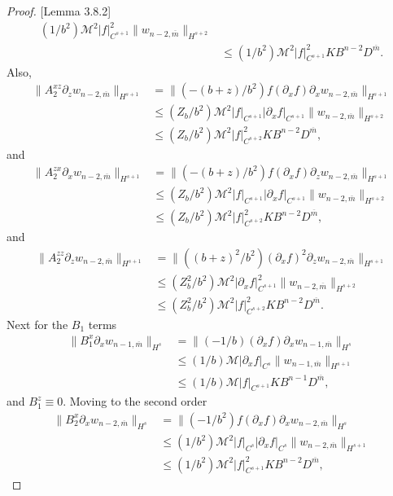 \begin{proof}{[Lemma 3.8.2]}
\begin{align*}
(1/b^2)\mathcal{M}^2|f|_{C^{s+1}}^2\|w_{n-2, \overline{m}}\|_{H^{s+2}} \\&\le
(1/b^2)\mathcal{M}^2|f|_{C^{s+1}}^2KB^{n-2}D^{\overline{m}}.
\end{align*}
Also,
\begin{align*}
\|A_2^{xz}\partial_z w_{n-2,\overline{m}}\|_{H^{s+1}} &= 
\|(-(b+z)/b^2)f(\partial_x f)\partial_x w_{n-2,\overline{m}}\|_{H^{s+1}}\\&\le
(Z_b/b^2)\mathcal{M}^2|f|_{C^{s+1}}|\partial_x f|_{C^{s+1}}\|w_{n-2, \overline{m}}\|_{H^{s+2}} \\&\le
(Z_b/b^2)\mathcal{M}^2|f|_{C^{s+2}}^2KB^{n-2}D^{\overline{m}},
\end{align*}
and
\begin{align*}
\|A_2^{zx}\partial_x w_{n-2,\overline{m}}\|_{H^{s+1}} &= 
\|(-(b+z)/b^2)f(\partial_x f)\partial_z w_{n-2,\overline{m}}\|_{H^{s+1}}\\&\le
(Z_b/b^2)\mathcal{M}^2|f|_{C^{s+1}}|\partial_x f|_{C^{s+1}}\|w_{n-2, \overline{m}}\|_{H^{s+2}} \\&\le
(Z_b/b^2)\mathcal{M}^2|f|_{C^{s+2}}^2KB^{n-2}D^{\overline{m}},
\end{align*}
and
\begin{align*}
\|A_2^{zz}\partial_z w_{n-2,\overline{m}}\|_{H^{s+1}} &= 
\|((b+z)^2/b^2)(\partial_x f)^2\partial_z w_{n-2,\overline{m}}\|_{H^{s+1}}\\&\le
(Z_b^2/b^2)\mathcal{M}^2|\partial_x f|_{C^{s+1}}^2\|w_{n-2, \overline{m}}\|_{H^{s+2}} \\&\le
(Z_b^2/b^2)\mathcal{M}^2|f|_{C^{s+2}}^2KB^{n-2}D^{\overline{m}}.
\end{align*}
Next for the $B_1$ terms
\begin{align*}
\|B_1^{x}\partial_x w_{n-1,\overline{m}}\|_{H^{s}} &= 
\|(-1/b)(\partial_x f)\partial_x w_{n-1,\overline{m}}\|_{H^{s}}\\&\le
(1/b)\mathcal{M}|\partial_x f|_{C^{s}}\|w_{n-1, \overline{m}}\|_{H^{s+1}} \\&\le
(1/b)\mathcal{M}|f|_{C^{s+1}}KB^{n-1}D^{\overline{m}},
\end{align*}
and $B_1^z\equiv 0$. Moving to the second order
\begin{align*}
\|B_2^{x}\partial_x w_{n-2,\overline{m}}\|_{H^{s}} &= 
\|(-1/b^2)f(\partial_x f)\partial_x w_{n-2,\overline{m}}\|_{H^{s}}\\&\le
(1/b^2)\mathcal{M}^2|f|_{C^{s}}|\partial_x f|_{C^{s}}\|w_{n-2, \overline{m}}\|_{H^{s+1}} \\&\le
(1/b^2)\mathcal{M}^2|f|_{C^{s+1}}^2KB^{n-2}D^{\overline{m}},

\end{align*}
\end{proof}
